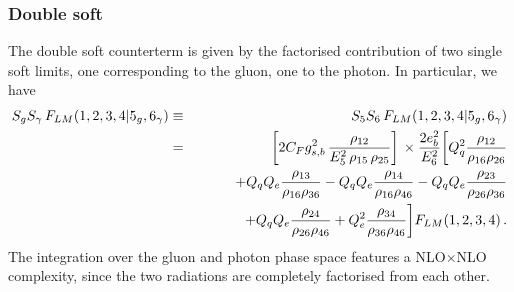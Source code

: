 \documentclass[12pt,a4paper]{article}
\newcommand{\nn}{\nonumber}
\newcommand{\beq}{\begin{eqnarray}}
\newcommand{\eeq}{\end{eqnarray}}
\begin{document}
\subsubsection{Double soft}

The double soft counterterm is given by the factorised contribution of two single soft limits, one corresponding to the gluon, one to the photon. In particular, we have
\beq
S_g S_\gamma \, F_{LM}(1,2,3,4 | 5_g, 6_\gamma)
&\equiv&
S_5 S_6 \, F_{LM}(1,2,3,4 | 5_g, 6_\gamma)
\nn \\
&=&
\bigg[
 2 C_F g_{s,b}^2 \, 
\frac{\rho_{12}}{E_5^2 \, \rho_{15} \, \rho_{25}} 
\bigg] \, \times
\frac{ 2 e_b^2 }{E_6^2} 
\bigg[ 
 Q^2_q  \frac{\rho_{12}}{\rho_{16} \rho_{26}}
\nn \\
&&
 + Q_q Q_{e} \frac{\rho_{13}}{\rho_{16} \rho_{36}}
- Q_q Q_{e}\frac{\rho_{14}}{\rho_{16} \rho_{46}}
- Q_{q}Q_{e} \frac{\rho_{23}}{\rho_{26} \rho_{36}}
\nn \\
&& \hspace{12mm}
+ Q_{q} Q_{e} \frac{\rho_{24}}{\rho_{26} \rho_{46}}
+ Q^2_{e} \frac{\rho_{34}}{\rho_{36} \rho_{46}}
\bigg]
F_{LM}(1,2,3,4)
  \, .
 \nn
\eeq
The integration over the gluon and photon phase space features a NLO$\times$NLO complexity, since the two radiations are completely factorised from each other.
\end{document}
